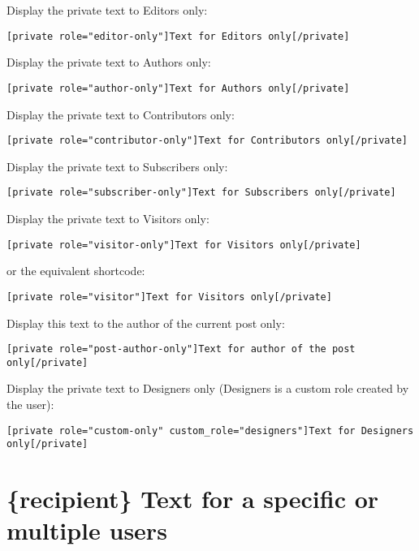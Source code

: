 Display the private text to Editors only:

\begin{lstlisting}
[private role="editor-only"]Text for Editors only[/private]
\end{lstlisting}

Display the private text to Authors only:

\begin{lstlisting}
[private role="author-only"]Text for Authors only[/private]
\end{lstlisting}

Display the private text to Contributors only:

\begin{lstlisting}
[private role="contributor-only"]Text for Contributors only[/private]
\end{lstlisting}

Display the private text to Subscribers only:

\begin{lstlisting}
[private role="subscriber-only"]Text for Subscribers only[/private]
\end{lstlisting}

Display the private text to Visitors only:

\begin{lstlisting}
[private role="visitor-only"]Text for Visitors only[/private]
\end{lstlisting}

or the equivalent shortcode:

\begin{lstlisting}
[private role="visitor"]Text for Visitors only[/private]
\end{lstlisting}

Display this text to the author of the current post only:

\begin{lstlisting}
[private role="post-author-only"]Text for author of the post only[/private]
\end{lstlisting}

Display the private text to Designers only (Designers is a custom role created
by the user):

\begin{lstlisting}
[private role="custom-only" custom_role="designers"]Text for Designers only[/private]
\end{lstlisting}

\section{\{recipient\} Text for a specific or multiple users}

